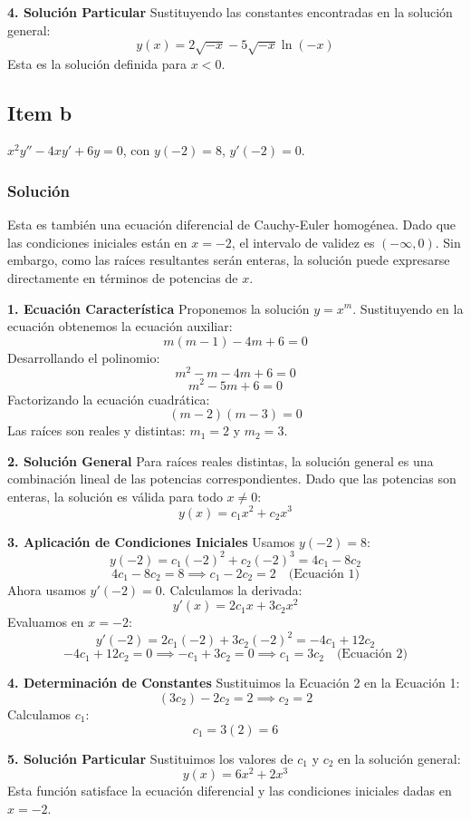 \documentclass[a4paper]{article}
\begin{document}
\textbf{4. Solución Particular}
Sustituyendo las constantes encontradas en la solución general:
$$
y(x) = 2 \sqrt{-x} - 5 \sqrt{-x} \ln(-x)
$$
Esta es la solución definida para $x < 0$.

\subsection{Item b}
$x^2 y'' - 4xy' + 6y = 0$, con $y(-2) = 8$, $y'(-2) = 0$.

\subsubsection{Solución}
Esta es también una ecuación diferencial de Cauchy-Euler homogénea. Dado que las condiciones iniciales están en $x = -2$, el intervalo de validez es $(-\infty, 0)$. Sin embargo, como las raíces resultantes serán enteras, la solución puede expresarse directamente en términos de potencias de $x$.

\textbf{1. Ecuación Característica}
Proponemos la solución $y = x^m$. Sustituyendo en la ecuación obtenemos la ecuación auxiliar:
$$
m(m-1) - 4m + 6 = 0
$$
Desarrollando el polinomio:
$$
m^2 - m - 4m + 6 = 0
$$
$$
m^2 - 5m + 6 = 0
$$
Factorizando la ecuación cuadrática:
$$
(m - 2)(m - 3) = 0
$$
Las raíces son reales y distintas: $m_1 = 2$ y $m_2 = 3$.

\textbf{2. Solución General}
Para raíces reales distintas, la solución general es una combinación lineal de las potencias correspondientes. Dado que las potencias son enteras, la solución es válida para todo $x \neq 0$:
$$
y(x) = c_1 x^2 + c_2 x^3
$$

\textbf{3. Aplicación de Condiciones Iniciales}
Usamos $y(-2) = 8$:
$$
y(-2) = c_1 (-2)^2 + c_2 (-2)^3 = 4c_1 - 8c_2
$$
$$
4c_1 - 8c_2 = 8 \implies c_1 - 2c_2 = 2 \quad \text{(Ecuación 1)}
$$
Ahora usamos $y'(-2) = 0$. Calculamos la derivada:
$$
y'(x) = 2c_1 x + 3c_2 x^2
$$
Evaluamos en $x = -2$:
$$
y'(-2) = 2c_1 (-2) + 3c_2 (-2)^2 = -4c_1 + 12c_2
$$
$$
-4c_1 + 12c_2 = 0 \implies -c_1 + 3c_2 = 0 \implies c_1 = 3c_2 \quad \text{(Ecuación 2)}
$$

\textbf{4. Determinación de Constantes}
Sustituimos la Ecuación 2 en la Ecuación 1:
$$
(3c_2) - 2c_2 = 2 \implies c_2 = 2
$$
Calculamos $c_1$:
$$
c_1 = 3(2) = 6
$$

\textbf{5. Solución Particular}
Sustituimos los valores de $c_1$ y $c_2$ en la solución general:
$$
y(x) = 6x^2 + 2x^3
$$
Esta función satisface la ecuación diferencial y las condiciones iniciales dadas en $x = -2$.
\end{document}
